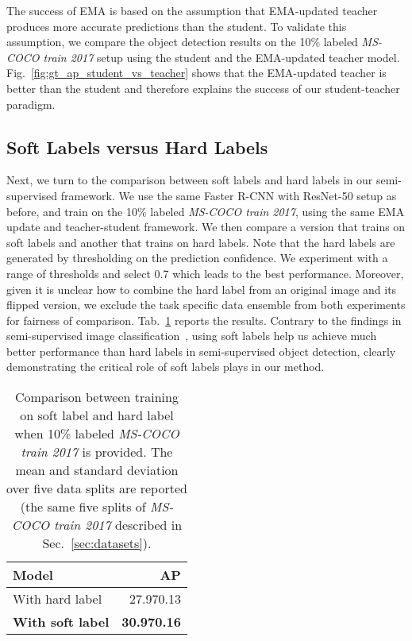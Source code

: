 \documentclass[final]{cvpr}
\begin{document}
The success of EMA is based on the assumption that EMA-updated teacher produces more accurate predictions than the student. To validate this assumption, we compare the object detection results on the 10\% labeled \textit{MS-COCO train 2017} setup using the student and the EMA-updated teacher model. 
Fig.~\ref{fig:gt_ap_student_vs_teacher} shows that the EMA-updated teacher is better than the student and therefore explains the success of our student-teacher paradigm.

\subsection{Soft Labels versus Hard Labels} 
\label{sec:abl:soft_label}

Next, we turn to the comparison between soft labels and hard labels in our semi-supervised framework. 
We use the same Faster R-CNN with ResNet-50 setup as before, and train on the 10\% labeled \textit{MS-COCO train 2017}, 
using the same EMA update and teacher-student framework. 
We then compare a version that trains on soft labels and another that trains on hard labels.
Note that the hard labels are generated by thresholding on the prediction confidence. 
We experiment with a range of thresholds and select 0.7 which leads to the best performance.
Moreover, given it is unclear how to combine the hard label from an original image and its flipped version, 
we exclude the task specific data ensemble from both experiments for fairness of comparison.
Tab.~\ref{tab:softlabel_1} reports the results. 
Contrary to the findings in semi-supervised image classification~\cite{sohn2020fixmatch}, using soft labels help us achieve much better performance than hard labels in semi-supervised object detection, clearly demonstrating the critical role of soft labels plays in our method.

\begin{table}[b]\centering
  \begin{tabular}{lr}
    \toprule
    Model &  AP\\
    \midrule
    With hard label & 27.970.13\\
    \textbf{With soft label} & \textbf{30.970.16}\\
    \bottomrule
  \end{tabular}
   \caption{Comparison between training on soft label and hard label when 10\% labeled \textit{MS-COCO train 2017} is provided. The mean and standard deviation over five data splits are reported (the same five splits of \textit{MS-COCO train 2017} described in Sec.~\ref{sec:datasets}).}
   \label{tab:softlabel_1}
\end{table}
\end{document}
